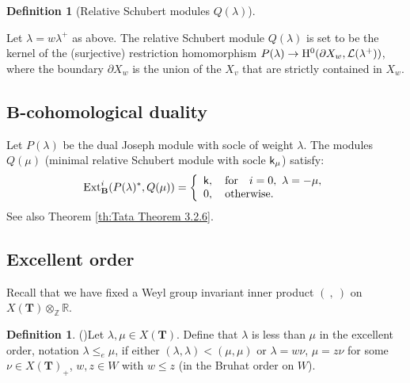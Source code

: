 \documentclass[sn-mathphys-num]{sn-jnl}%
\newcommand{\Ll}{\mathcal L}
\newcommand{\rep}{{\mathrm{rep}}}
\newcommand{\Ext}{{\mathrm{Ext}}}
\newcommand*{\Dd}{\mathop{\mathrm D\kern0pt}\nolimits}
\newcommand{\sk}{{\sf k}}
\newcommand{\fb}{\mathbf B}
\newcommand{\bt}{\mathbf T}
\newcommand{\fX}{{ X}}
\theoremstyle{definition}
\newtheorem{definition}[theorem]{Definition}%
\newtheorem{remark}[theorem]{Remark}
\begin{document}
\begin{definition}[Relative Schubert modules $Q(\lambda)$]\label{def:defineQ}

Let $\lambda=w\lambda^+$ as above. 
The relative Schubert module $Q(\lambda)$ is set to be the kernel of the (surjective) restriction homomorphism $P(\lambda)\rightarrow {\rm H}^0(\partial \fX_w,\Ll (\lambda ^+))$, where the boundary $\partial \fX_w$ is the union of the $\fX_v$ that are strictly contained in $\fX_w$.
\end{definition}

\subsection{$\fb$-cohomological duality}\label{subsec:key_orthogonality}

Let $P(\lambda)$ be the dual Joseph module with socle of weight $\lambda$. The modules $Q(\mu)$ (minimal relative Schubert module with socle $\sk_{\mu}$) satisfy:
\begin{equation}\label{eq:P-Q-duality}
\Ext ^i_{\fb}(P(\lambda)^{\ast},Q(\mu)) = \left\{
   \begin{array}{l}
    {\sf k}, \quad {\rm for} \quad i=0, \  \lambda=-\mu,\\
    0, \quad {\rm otherwise}. \\
   \end{array}
  \right.
\end{equation}
See also Theorem \ref{th:Tata Theorem 3.2.6}.
\subsection{Excellent order}\label{subsec:excord}

Recall that we have fixed a Weyl group invariant inner product $(~,~)$ on $X({\bt})\otimes _{\mathbb Z}\mathbb R$.

\begin{definition}(\cite{WvdK})\label{def:excord}
Let $\lambda, \mu \in X({\bt})$. Define that $\lambda$ is less than $\mu$ in the excellent order, notation $\lambda \leq_e \mu$, if either $(\lambda, \lambda)<(\mu,\mu)$ or $\lambda = w\nu$, $\mu=z\nu$ for some $\nu \in X({\bt})_+$, $w,z\in W$ with $w\leq z$ (in the Bruhat order on $W$).
\end{definition}
\end{document}
